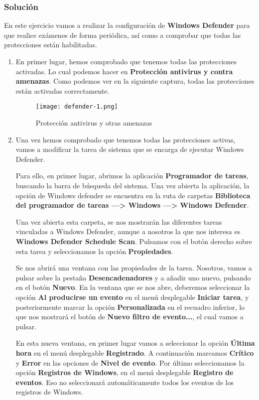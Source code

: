\subsubsection{Solución}
En este ejercicio vamos a realizar la configuración de \textbf{Windows Defender} para que realice exámenes de forma periódica, así como a comprobar que todas las protecciones están habilitadas.

\begin{enumerate}
    \item En primer lugar, hemos comprobado que tenemos todas las protecciones activadas. Lo cual podemos hacer en \textbf{Protección antivirus y contra amenazas}. Como podemos ver en la siguiente captura, todas las protecciones están activadas correctamente.

    \begin{figure}[H]
        \centering
        \texttt{[image: defender-1.png]}
        \caption{Protección antivirus y otras amenazas}
    \end{figure}

    \item Una vez hemos comprobado que tenemos todas las protecciones activas, vamos a modificar la tarea de sistema que se encarga de ejecutar Windows Defender.

    Para ello, en primer lugar, abrimos la aplicación \textbf{Programador de tareas}, buscando la barra de búsqueda del sistema. Una vez abierta la aplicación, la opción de Windows defender se encuentra en la ruta de carpetas \textbf{Biblioteca del programador de tareas ---> Windows ---> Windows Defender}.

    Una vez abierta esta carpeta, se nos mostrarán las diferentes tareas vinculadas a Windows Defender, aunque a nosotros la que nos interesa es \textbf{Windows Defender Schedule Scan}. Pulsamos con el botón derecho sobre esta tarea y seleccionamos la opción \textbf{Propiedades}.

    Se nos abrirá una ventana con las propiedades de la tarea. Nosotros, vamos a pulsar sobre la pestaña \textbf{Desencadenadores} y a añadir uno nuevo, pulsando en el botón \textbf{Nuevo}. En la ventana que se nos abre, deberemos seleccionar la opción \textbf{Al producirse un evento} en el menú desplegable \textbf{Iniciar tarea}, y posteriormente marcar la opción \textbf{Personalizada} en el recuadro inferior, lo que nos mostrará el botón de \textbf{Nuevo filtro de evento...}, el cual vamos a pulsar.

    En esta nueva ventana, en primer lugar vamos a seleccionar la opción \textbf{Última hora} en el menú desplegable \textbf{Registrado}. A continuación marcamos \textbf{Crítico} y \textbf{Error} en las opciones de \textbf{Nivel de evento}. Por último seleccionamos la opción \textbf{Registros de Windows}, en el menú desplegable \textbf{Registro de eventos}. Eso no seleccionará automáticamente todos los eventos de los registros de Windows.


\end{enumerate}
